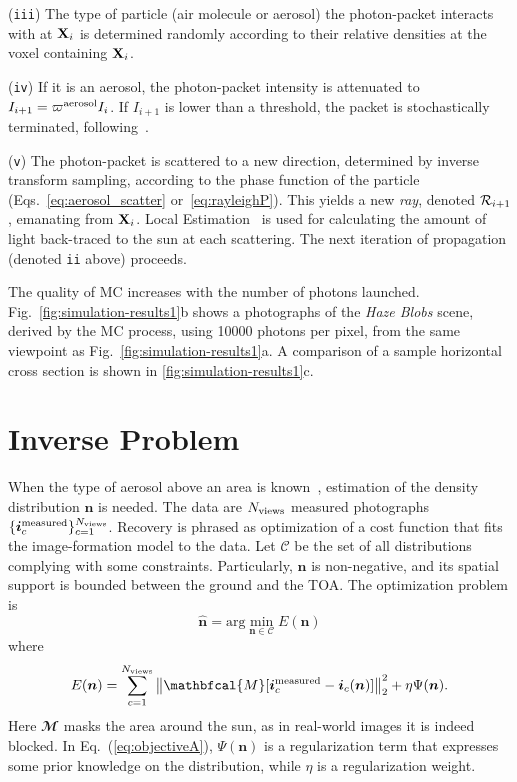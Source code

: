\documentclass[10pt,letterpaper]{article}
\newcommand{\argmin}{\mathrm{arg}\min}
\newcommand{\vect}[1]{\bm{#1}}
\newcommand{\MaskSun}{\mathbfcal{M}}
\newcommand{\DistSet}{\mathcal{C}}
\newcommand{\DistUnknown}{\vect{n}}
\newcommand{\DistEstimated}{\hat{\vect{n}}}
\newcommand{\CostFunc}[1]{E(#1)}
\begin{document}
\noindent ({\tt iii}) The type of particle (air molecule or aerosol)
the photon-packet interacts with at ${\bf X}_{i}$ is determined
randomly according to their relative densities at the voxel containing
${\bf X}_{i}$.

\noindent ({\tt iv}) If it is an aerosol, the photon-packet intensity
is attenuated to $I_{i+1}=\varpi^{\rm aerosol}I_{i}$. If $I_{i+1}$ is
lower than a threshold, the packet is stochastically terminated,
following~\cite{Iwabuchi2006}.

\noindent ({\tt v}) The photon-packet is scattered to a new direction,
determined by inverse transform sampling, according to the phase
function of the particle (Eqs.~\ref{eq:aerosol_scatter}
or~\ref{eq:rayleighP}). This yields a new {\em ray}, denoted ${\cal
  R}_{i+1}$, emanating from ${\bf X}_{i}$. Local
Estimation~\cite{marshak20053d} is used for calculating the amount of
light back-traced to the sun at each scattering. The next iteration of
propagation (denoted {\tt ii} above) proceeds.


The quality of MC increases with the number of photons launched.
Fig.~\ref{fig:simulation-results1}b shows a photographs of the {\em
  Haze Blobs} scene, derived by the MC process, using \num{10000}
photons per pixel, from the same viewpoint as
Fig.~\ref{fig:simulation-results1}a.  A comparison of a sample
horizontal cross section is shown in \cref{fig:simulation-results1}c.




\section{Inverse Problem}
\label{sec:inverse-problem}

When the type of aerosol above an area is known~\cite{Martonchik2009},
estimation of the density distribution $\DistUnknown$ is needed. The
data are $N_{\rm views}$ measured photographs $\{ {\bm i}^{\rm
  measured}_c\}_{c=1}^{N_{\rm views}}$. Recovery is phrased as
optimization of a cost function that fits the image-formation model to
the data. Let $\DistSet$ be the set of all distributions complying
with some constraints.  Particularly, $\DistUnknown$ is non-negative,
and its spatial support is bounded between the ground and the TOA. The
optimization problem is
\begin{equation}
  \label{eq:minobjectiveA}
  \DistEstimated =
  \argmin_{\DistUnknown \in \DistSet} \CostFunc{\DistUnknown}
\end{equation}
where
\begin{equation}
  \label{eq:objectiveA}
  \CostFunc{\DistUnknown}
  = \sum_{c=1}^{N_{\rm views}}
  \left\|
    \MaskSun[{\bm i}^{\rm measured}_c - {\bm i}_c({\bm n})]
  \right\|^2_2  + \eta \Psi({\bm n}).
\end{equation}
Here $\MaskSun$ masks the area around the sun, as in real-world images
it is indeed blocked.  In Eq.~(\ref{eq:objectiveA}), $\Psi({\bm n})$
is a regularization term that expresses some prior knowledge on the
distribution, while $\eta$ is a regularization weight.
\end{document}
